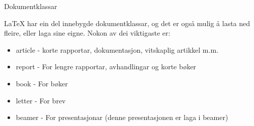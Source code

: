 	\begin{frame}{Dokumentklassar}
		
		\LaTeX{} har ein del innebygde dokumentklassar, og det er også mulig å lasta ned fleire, eller laga sine eigne. Nokon av dei viktigaste er:
		
		\begin{itemize}
			\item article - korte rapportar, dokumentasjon, vitskaplig artikkel m.m.
			\item report - For lengre rapportar, avhandlingar og korte bøker
			\item book - For bøker
			\item letter - For brev
			\item beamer - For presentasjonar (denne presentasjonen er laga i beamer)
		\end{itemize}
		
	\end{frame}





